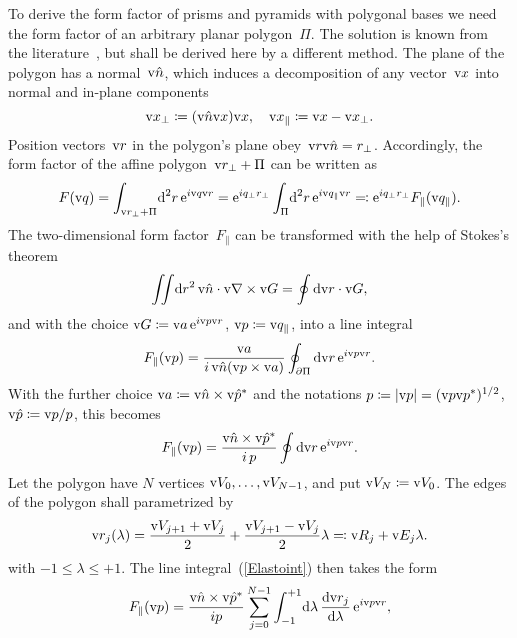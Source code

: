 To derive the form factor of prisms and pyramids with polygonal bases
we need the form factor of an arbitrary planar polygon~$\Pi$.
The solution is known from the literature~\cite{LeMi83},
but shall be derived here by a different method.
The plane of the polygon has a normal~$\text{v}{\hat n}$,
which induces a decomposition of any vector~$\text{v}{x}$ into normal
and in-plane components
\begin{equation}
  \text{v}{x}_\perp\coloneqq (\text{v}{\hat n}\text{v}{x})\text{v}{x},\quad
  \text{v}{x}_\parallel\coloneqq\text{v}{x}-\text{v}{x}_\perp.
\end{equation}
Position vectors~$\text{v}{r}$ in the polygon's plane obey~$\text{v}{r}\text{v}{\hat n}=r_\perp$.
Accordingly, the form factor of the affine polygon~$\text{v}{r}_\perp+\Pi$
can be written as
%
\begin{equation}\label{Eff2d}
  F(\text{v}{q})
  = \int_{\text{v}{r}_\perp+\Pi}\!\text{d}^2r\, \text{e}^{i\text{v}{q}\text{v}{r}}
  =\text{e}^{iq_\perp r_\perp} \int_{\Pi}\!\text{d}^2r\, \text{e}^{i\text{v}{q}_\parallel\text{v}{r}}
  \eqqcolon \text{e}^{iq_\perp r_\perp} F_\parallel(\text{v}{q}_\parallel).
\end{equation}
The two-dimensional form factor~$F_\parallel$
can be transformed with the help of Stokes's theorem
\begin{equation}
  \iint\!\text{d} r^2\,\text{v}{\hat n}\cdot\text{v}{\nabla}\times\text{v}{G} = \oint \text{d}\text{v}{r}\cdot\text{v}{G},
\end{equation}
and with the choice $\text{v}{G}\coloneqq\text{v}{a}\, \text{e}^{i\text{v}{p}\text{v}{r}}$, $\text{v}{p}\coloneqq\text{v}{q}_\parallel$,
into a line integral
\begin{equation}
  F_\parallel(\text{v}{p})=\frac{\text{v}{a}}{i\, \text{v}{\hat n}(\text{v}{p}\times\text{v}{a})} \oint_{\partial\Pi} \text{d}\text{v}{r}\,\text{e}^{i\text{v}{p}\text{v}{r}}.
\end{equation}
With the further choice $\text{v}{a}\coloneqq\text{v}{\hat n}\times\text{v}{\hat p}^*$
and the notations $p\coloneqq|\text{v}{p}|=(\text{v}{p}\text{v}{p}^*)^{1/2}$, $\text{v}{\hat p}\coloneqq\text{v}{p}/p$,
this becomes
\begin{equation}\label{Elastoint}
  F_\parallel(\text{v}{p})=\frac{\text{v}{\hat n}\times\text{v}{\hat p}^*}{i\,p} \oint \text{d}\text{v}{r}\,\text{e}^{i\text{v}{p}\text{v}{r}}.
\end{equation}
Let the polygon have $N$ vertices $\text{v}{V}_0,\ldots,\text{v}{V}_{N-1}$,
and put $\text{v}{V}_N\coloneqq\text{v}{V}_0$.
The edges of the polygon shall parametrized by
\begin{equation}
  \text{v}{r}_j(\lambda) = \frac{\text{v}{V}_{j+1}+\text{v}{V}_j}{2} + \frac{\text{v}{V}_{j+1}-\text{v}{V}_j}{2} \lambda
  \eqqcolon \text{v}{R}_j + \text{v}{E}_j\lambda.
\end{equation}
with $-1\le\lambda\le+1$.
The line integral~(\ref{Elastoint}) then takes the form
\begin{equation}
    F_\parallel(\text{v}{p})
   = \frac{\text{v}{\hat n}\times\text{v}{\hat p}^*}{ip} \sum_{j=0}^{N-1}
              \int_{-1}^{+1}\!\text{d}\lambda\, \frac{\text{d}\text{v}{r}_j}{\text{d}\lambda}\,\text{e}^{i\text{v}{p}\text{v}{r}},
\end{equation}
